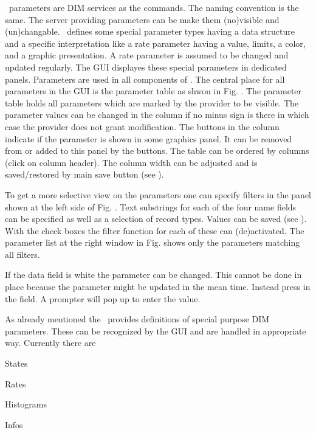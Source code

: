 \dabc\ parameters are DIM services as the commands. The naming convention is
the same. The server providing parameters can be make them (no)visible 
and (un)changable. \dabc\ defines some special parameter types
having a data structure and a specific interpretation like
a rate parameter having a value, limits, a color, and a graphic presentation.
A rate parameter is assumed to be changed and updated regularly.
The GUI displayes these special parameters in dedicated panels. 
Parameters are used in all components of \dabc.
The central place for all parameters in the GUI is the
parameter table as shwon in Fig. .
The parameter table holds all parameters which are marked by the provider to be visible.
The parameter values can be changed
in the  column if no minus sign is there in which case the
provider does not grant modification.
The buttons in the  column 
indicate if the parameter is shown in some graphics panel. It can be removed from or added
to this panel by the buttons.
The table can be ordered by columns (click on column header). 
The column width can be adjusted and is saved/restored by main save button
(see ).

To get a more selective view on the parameters one can specify
filters in the panel shown at the left side of Fig. . 
Text substrings for each of the four name fields
can be specified as well as a selection of record types.
Values can be saved (see ).
With the check boxes the filter function for each of these can (de)activated.
The parameter list at the right window in Fig. 
shows only the parameters matching all filters.

If the data field is white the parameter can be changed.
This cannot be done in place because the parameter might be
updated in the mean time. Instead press  in the field.
A prompter will pop up to enter the value.

As already mentioned the \dabc\ provides definitions of
special purpose DIM parameters. These 
can be recognized by the GUI and are handled in appropriate way.
Currently there are
\bcir
\item States
\item Rates
\item Histograms
\item Infos
\ecir

